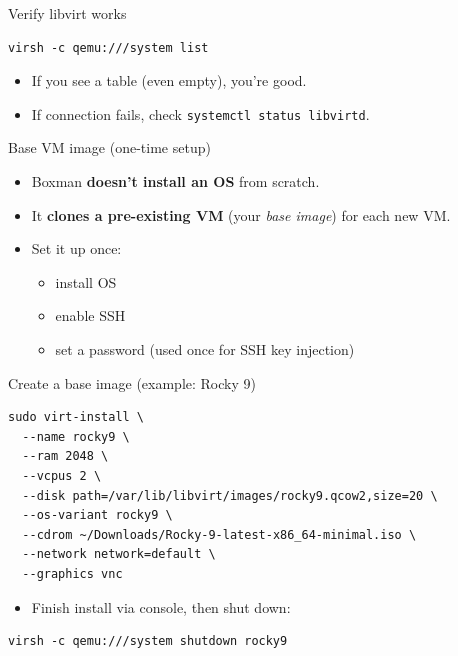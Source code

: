 \documentclass[aspectratio=169]{beamer}
\begin{document}
\begin{frame}[fragile]{Verify libvirt works}
\begin{lstlisting}[style=boxman]
virsh -c qemu:///system list
\end{lstlisting}
\begin{itemize}
  \item If you see a table (even empty), you're good.
  \item If connection fails, check \texttt{systemctl status libvirtd}.
\end{itemize}
\end{frame}

\begin{frame}[fragile]{Base VM image (one-time setup)}
\begin{itemize}
  \item Boxman \textbf{doesn't install an OS} from scratch.
  \item It \textbf{clones a pre-existing VM} (your \emph{base image}) for each new VM.
  \item Set it up once:
    \begin{itemize}
      \item install OS
      \item enable SSH
      \item set a password (used once for SSH key injection)
    \end{itemize}
\end{itemize}
\end{frame}

\begin{frame}[fragile]{Create a base image (example: Rocky 9)}
\begin{lstlisting}[style=boxman]
sudo virt-install \
  --name rocky9 \
  --ram 2048 \
  --vcpus 2 \
  --disk path=/var/lib/libvirt/images/rocky9.qcow2,size=20 \
  --os-variant rocky9 \
  --cdrom ~/Downloads/Rocky-9-latest-x86_64-minimal.iso \
  --network network=default \
  --graphics vnc
\end{lstlisting}
\begin{itemize}
  \item Finish install via console, then shut down:
\end{itemize}
\begin{lstlisting}[style=boxman]
virsh -c qemu:///system shutdown rocky9
\end{lstlisting}
\end{frame}
\end{document}
